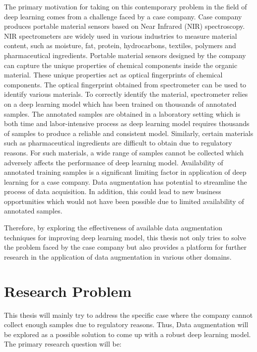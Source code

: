 The primary motivation for taking on this contemporary problem in the field of deep learning comes from a challenge faced by a case company. Case company produces portable material sensors based on Near Infrared (NIR) spectroscopy. NIR spectrometers are widely used in various industries to measure material content, such as moisture, fat, protein, hydrocarbons, textiles, polymers and pharmaceutical ingredients. Portable material sensors designed by the company can capture the unique properties of chemical components inside the organic material. These unique properties act as optical fingerprints of chemical components. The optical fingerprint obtained from spectrometer can be used to identify various materials. To correctly identify the material, spectrometer relies on a deep learning model which has been trained on thousands of annotated samples. The annotated samples are obtained in a laboratory setting which is both time and labor-intensive process as deep learning model requires thousands of samples to produce a reliable and consistent model. Similarly, certain materials such as pharmaceutical ingredients are difficult to obtain due to regulatory reasons. For such materials, a wide range of samples cannot be collected which adversely affects the performance of deep learning model. Availability of annotated training samples is a significant limiting factor in application of deep learning for a case company. Data augmentation has potential to streamline the process of data acquisition. In addition, this could lead to new business opportunities which would not have been possible due to limited availability of annotated samples.   

Therefore, by exploring the effectiveness of available data augmentation techniques for improving deep learning model, this thesis not only tries to solve the problem faced by the case company but also provides a platform for further research in the application of data augmentation in various other domains.


\section{Research Problem}

This thesis will mainly try to address the specific case where the company cannot collect enough samples due to regulatory reasons. Thus, Data augmentation will be explored as a possible solution to come up with a robust deep learning model. The primary research question will be:

